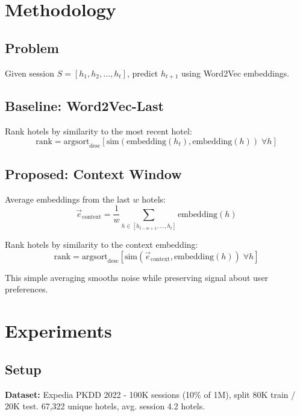 \documentclass[sigconf]{acmart}
\begin{document}
\section{Methodology}

\subsection{Problem}

Given session $S = [h_1, h_2, \ldots, h_t]$, predict $h_{t+1}$ using Word2Vec embeddings.

\subsection{Baseline: Word2Vec-Last}

Rank hotels by similarity to the most recent hotel:
\begin{equation}
\text{rank} = \text{argsort}_{\text{desc}}[\text{sim}(\text{embedding}(h_t), \text{embedding}(h)) \; \forall h]
\end{equation}

\subsection{Proposed: Context Window}

Average embeddings from the last $w$ hotels:
\begin{equation}
\vec{e}_{\text{context}} = \frac{1}{w} \sum_{h \in [h_{t-w+1}, \ldots, h_t]} \text{embedding}(h)
\end{equation}

Rank hotels by similarity to the context embedding:
\begin{equation}
\text{rank} = \text{argsort}_{\text{desc}}[\text{sim}(\vec{e}_{\text{context}}, \text{embedding}(h)) \; \forall h]
\end{equation}

This simple averaging smooths noise while preserving signal about user preferences.

\section{Experiments}

\subsection{Setup}

\textbf{Dataset:} Expedia PKDD 2022 - 100K sessions (10\% of 1M), split 80K train / 20K test. 67,322 unique hotels, avg. session 4.2 hotels.
\end{document}
